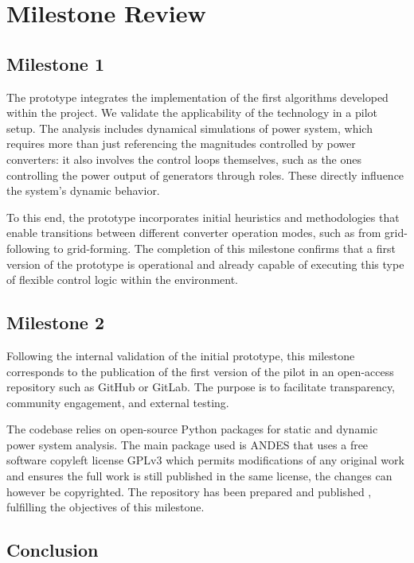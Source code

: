 \documentclass{article}
\begin{document}
\section{Milestone Review}

\subsection*{Milestone 1}

The prototype  integrates the implementation of the first algorithms developed within the project. We validate the applicability of the technology in a pilot setup. The analysis includes dynamical simulations of power system, which requires more than just referencing the magnitudes controlled by power converters: it also involves the control loops themselves, such as the ones controlling the power output of generators through roles. These directly influence the system's dynamic behavior.

To this end, the prototype incorporates initial heuristics and methodologies that enable transitions between different converter operation modes, such as from grid-following to grid-forming. The completion of this milestone confirms that a first version of the prototype is operational and already capable of executing this type of flexible control logic within the environment.

\subsection*{Milestone 2}

Following the internal validation of the initial prototype, this milestone corresponds to the publication of the first version of the pilot in an open-access repository such as GitHub or GitLab. The purpose is to facilitate transparency, community engagement, and external testing.

The codebase relies on open-source Python packages for static and dynamic power system analysis. The main package used is ANDES \cite{article:andes} that uses a free software copyleft license GPLv3 which permits modifications of any original work and ensures the full work is still published in the same license, the changes can however be copyrighted. The repository has been prepared and published \cite{git:eroots}, fulfilling the objectives of this milestone.

\subsection{Conclusion}
\end{document}
